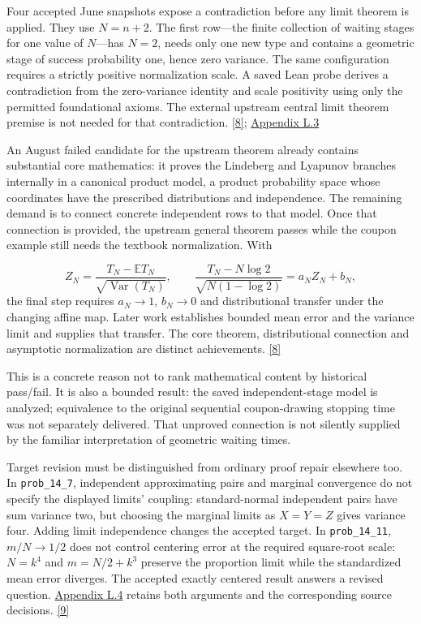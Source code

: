 Four accepted June snapshots expose a contradiction before any limit theorem is applied. They use $N=n+2$. The first row—the finite collection of waiting stages for one value of $N$—has $N=2$, needs only one new type and contains a geometric stage of success probability one, hence zero variance. The same configuration requires a strictly positive normalization scale. A saved Lean probe derives a contradiction from the zero-variance identity and scale positivity using only the permitted foundational axioms. The external upstream central limit theorem premise is not needed for that contradiction. \href{en.pdf\#ref-8}{\mbox{[8]}}; \href{en-appendix.pdf\#l3}{Appendix L.3}

An August failed candidate for the upstream theorem already contains substantial core mathematics: it proves the Lindeberg and Lyapunov branches internally in a canonical product model, a product probability space whose coordinates have the prescribed distributions and independence. The remaining demand is to connect concrete independent rows to that model. Once that connection is provided, the upstream general theorem passes while the coupon example still needs the textbook normalization. With

\[
Z_N=\frac{T_N-\mathbb E T_N}{\sqrt{\operatorname{Var}(T_N)}},\qquad
\frac{T_N-N\log2}{\sqrt{N(1-\log2)}}=a_N Z_N+b_N,
\]
the final step requires $a_N\to1$, $b_N\to0$ and distributional transfer under the changing affine map. Later work establishes bounded mean error and the variance limit and supplies that transfer. The core theorem, distributional connection and asymptotic normalization are distinct achievements. \href{en.pdf\#ref-8}{\mbox{[8]}}

This is a concrete reason not to rank mathematical content by historical pass/fail. It is also a bounded result: the saved independent-stage model is analyzed; equivalence to the original sequential coupon-drawing stopping time was not separately delivered. That unproved connection is not silently supplied by the familiar interpretation of geometric waiting times.

Target revision must be distinguished from ordinary proof repair elsewhere too. In \nolinkurl{prob_14_7}, independent approximating pairs and marginal convergence do not specify the displayed limits' coupling: standard-normal independent pairs have sum variance two, but choosing the marginal limits as $X=Y=Z$ gives variance four. Adding limit independence changes the accepted target. In \nolinkurl{prob_14_11}, $m/N\to1/2$ does not control centering error at the required square-root scale: $N=k^4$ and $m=N/2+k^3$ preserve the proportion limit while the standardized mean error diverges. The accepted exactly centered result answers a revised question. \href{en-appendix.pdf\#l4}{Appendix L.4} retains both arguments and the corresponding source decisions. \href{en.pdf\#ref-9}{\mbox{[9]}}

